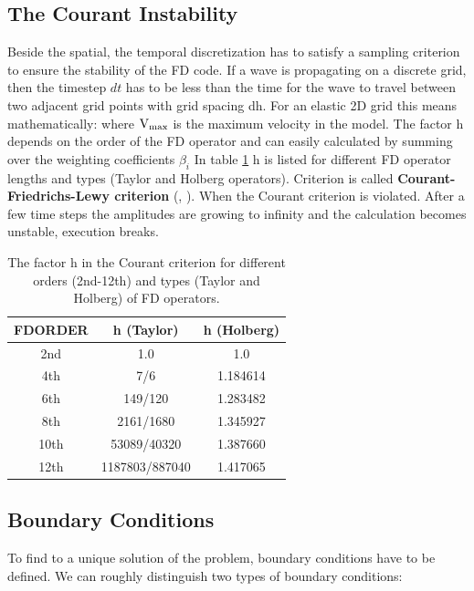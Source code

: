 \documentclass{hitec}
\begin{document}
\subsection{The Courant Instability}\label{courant}
Beside the spatial, the temporal discretization has to satisfy a sampling criterion to ensure the stability of the FD code. If a 
wave is propagating on a discrete grid, then the timestep $dt$ has to be less than the time for the wave to travel between two adjacent grid 
points with grid spacing dh. For an elastic 2D grid this means mathematically:
where $\rm{V_{max}}$ is the maximum velocity in the model. The factor h depends on the order of the FD operator and can easily calculated by summing over the weighting coefficients $\beta_i$
In table \ref{courant.1} h is listed for different FD operator lengths and types (Taylor and Holberg operators). Criterion  
is called {\bf{Courant-Friedrichs-Lewy criterion}} (\cite{courant:28}, \cite{courant:67}). When the Courant criterion is violated. After a few time steps the amplitudes are growing to infinity and the calculation becomes unstable, execution breaks.
\begin{table}[hbt]
	\begin{center}
		\begin{tabular}{ccc}\hline \hline
			FDORDER & h (Taylor)      & h (Holberg) \\ \hline 
			2nd   &   1.0             &  1.0        \\
			4th   &   7/6             &  1.184614   \\
			6th   &   149/120         &  1.283482   \\
			8th   &   2161/1680       &  1.345927   \\
			10th  &   53089/40320     &  1.387660   \\
			12th  &   1187803/887040  &  1.417065   \\   
			\hline \hline
		\end{tabular}
		\caption{\label{courant.1} The factor h in the Courant criterion for different orders (2nd-12th) and types (Taylor and Holberg) of FD operators.}
	\end{center}
\end{table} 

\newpage

\subsection{Boundary Conditions}\label{bound_cond}
To find to a unique solution of the problem, boundary conditions have to be defined. We can roughly distinguish two types of boundary conditions:
\end{document}
